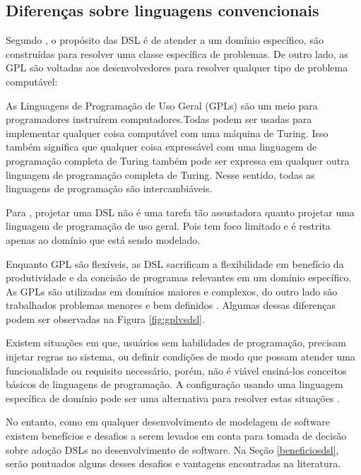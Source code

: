 \subsection{Diferenças sobre linguagens convencionais}
\label{diferencasdsl}

Segundo , o propósito das \gls{DSL} é de atender a um domínio específico, são construídas para resolver uma classe específica de problemas. De outro lado, as \gls{GPL} são voltadas aos desenvolvedores para resolver qualquer tipo de problema computável:

\begin{citacao}
As Linguagens de Programação de Uso Geral (GPLs) são um meio para programadores instruírem computadores.Todas podem ser usadas para implementar qualquer coisa computável com uma máquina de Turing. Isso também significa que qualquer coisa expressável com uma linguagem de programação completa de Turing também pode ser expressa em qualquer outra linguagem de programação completa de Turing. Nesse sentido, todas as linguagens de programação são intercambiáveis. \cite[p.27, tradução nossa]{dslengineering}
\end{citacao}

Para , projetar uma \gls{DSL} não é uma tarefa tão assustadora quanto projetar uma linguagem de programação de uso geral. Pois tem foco limitado e é restrita apenas ao domínio que está sendo modelado.

Enquanto \gls{GPL} são flexíveis, as \gls{DSL} sacrificam a flexibilidade em benefício da produtividade e da concisão de programas relevantes em um domínio específico. As \gls{GPL}s são utilizadas em domínios maiores e complexos, do outro lado são trabalhados problemas menores e bem definidos \cite{dslengineering}. Algumas dessas diferenças podem ser observadas na  Figura \ref{fig:gplvsdsl}.



Existem situações em que, usuários sem habilidades de programação, precisam injetar regras no sistema, ou definir condições de modo que possam atender uma funcionalidade ou requisito necessário, porém, não é viável ensiná-los conceitos básicos de linguagens de programação. A configuração usando uma linguagem específica de domínio pode ser uma alternativa para resolver estas situações \cite{novak2010easy}.  

No entanto, como em qualquer desenvolvimento de modelagem de software existem benefícios e desafios a serem levados em conta para tomada de decisão sobre adoção \gls{DSL}s no desenvolvimento de software. Na Seção \ref{beneficiosdsl}, serão pontuados alguns desses desafios e vantagens encontradas na literatura.

